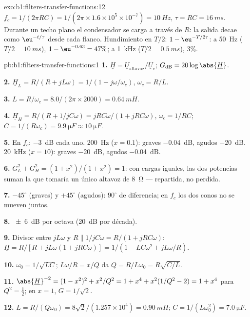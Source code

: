 \begin{solution}{exo:b1:filters-transfer-functions:12}
$f_c = 1/(2\pi RC) = 1/(2\pi \times 1.6\times10^5 \times 10^{-7}) =
\qty{10}{Hz}$, $\tau = RC = \qty{16}{ms}$. Durante un techo plano el
condensador se carga a través de $R$: la salida decae como $\eu^{-t/\tau}$
desde cada flanco. Hundimiento en $T/2$: $1 - \eu^{-T/2\tau}$: a \qty{50}{Hz}
($T/2 = \qty{10}{ms}$), $1 - \eu^{-0.63} = 47\%$; a \qty{1}{kHz}
($T/2 = \qty{0.5}{ms}$), $3\%$.
\end{solution}

\begin{solution}{pb:b1:filters-transfer-functions:1}
\textbf{1.} $\underline H = \underline U_{\text{altavoz}}/\underline U_e$;
$G_{\mathrm{dB}} = 20\log\abs{\underline H}$.

\textbf{2.} $\underline H_L = R/(R + jL\omega) = 1/(1 + j\omega/\omega_c)$,
$\omega_c = R/L$.

\textbf{3.} $L = R/\omega_c = 8.0/(2\pi \times 2000) = \qty{0.64}{mH}$.

\textbf{4.} $\underline H_H = R/(R + 1/jC\omega) = jRC\omega/(1 + jRC\omega)$,
$\omega_c = 1/RC$; $C = 1/(R\omega_c) = \qty{9.9}{\micro F} \approx
\qty{10}{\micro F}$.

\textbf{5.} En $f_c$: \qty{-3}{dB} cada uno. \qty{200}{Hz} ($x = 0.1$):
graves \qty{-0.04}{dB}, agudos \qty{-20}{dB}. \qty{20}{kHz} ($x = 10$):
graves \qty{-20}{dB}, agudos \qty{-0.04}{dB}.

\textbf{6.} $G_L^2 + G_H^2 = (1 + x^2)/(1 + x^2) = 1$: con cargas iguales,
las dos potencias suman la que tomaría un único altavoz de \qty{8}{\ohm}
--- repartida, no perdida.

\textbf{7.} $-45^\circ$ (graves) y $+45^\circ$ (agudos): $90^\circ$ de
diferencia; en $f_c$ los dos conos no se mueven juntos.

\textbf{8.} \qty{\pm 6}{dB} por octava (\qty{20}{dB} por década).

\textbf{9.} Divisor entre $jL\omega$ y $R \parallel 1/jC\omega =
R/(1 + jRC\omega)$: $\underline H = R/[R + jL\omega(1 + jRC\omega)] =
1/(1 - LC\omega^2 + jL\omega/R)$.

\textbf{10.} $\omega_0 = 1/\sqrt{LC}$; $L\omega/R = x/Q$ da $Q =
R/L\omega_0 = R\sqrt{C/L}$.

\textbf{11.} $\abs{\underline H}^{-2} = (1 - x^2)^2 + x^2/Q^2 = 1 + x^4 +
x^2(1/Q^2 - 2) = 1 + x^4$ para $Q^2 = \tfrac12$; en $x = 1$, $G = 1/\sqrt2$.

\textbf{12.} $L = R/(Q\omega_0) = 8\sqrt2/(1.257\times10^4) = \qty{0.90}{mH}$;
$C = 1/(L\omega_0^2) = \qty{7.0}{\micro F}$.


\end{solution}
